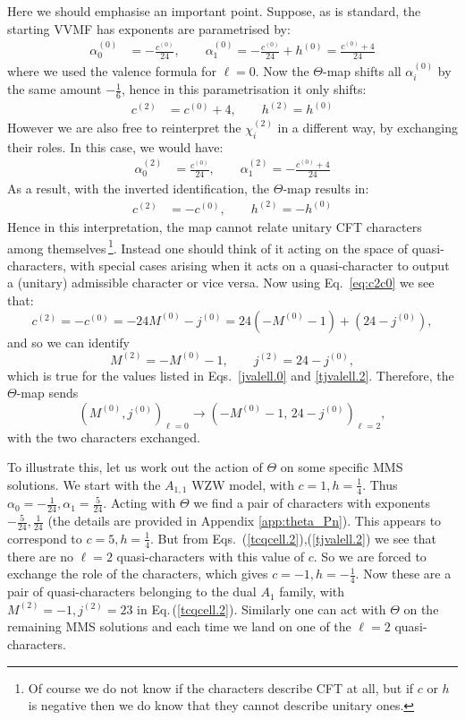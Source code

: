 \documentclass[11pt]{article}
\newcommand\be{\begin{equation}}
\newcommand\ee{\end{equation}}
\newcommand{\eref}[1]{Eq.\,(\ref{#1})}
\begin{document}
Here we should emphasise an important point. Suppose, as is standard, the starting VVMF has exponents are parametrised by:
\be
\begin{split}
\alpha_0^{(0)} &=-\frac{c^{(0)}}{24}, \qquad
\alpha_1^{(0)} =-\frac{c^{(0)}}{24}+h^{(0)}=\frac{c^{(0)}+4}{24}
\end{split}
\label{alphaell.0}
\ee
where we used the valence formula for $\ell=0$. 
Now the $\Theta$-map shifts all $\alpha_i^{(0)}$ by the same amount $-\frac16$, hence in this parametrisation it only shifts: \be
\begin{split}
c^{(2)} &= c^{(0)}+4, \qquad h^{(2)} = h^{(0)}
\end{split}
\ee
However we are also free to reinterpret the $\chi_i^{(2)}$ in a different way, by exchanging their roles. In this case, we would have:
\be
\begin{split}
\alpha_0^{(2)} &=\frac{c^{(0)}}{24},\qquad 
\alpha_1^{(2)} =-\frac{c^{(0)}+4}{24}
\end{split}
\ee
As a result, with the inverted identification, the $\Theta$-map results in:
\be\label{eq:c2c0}
\begin{split}
c^{(2)} &= -c^{(0)},\qquad h^{(2)} = -h^{(0)}
\end{split}
\ee
Hence in this interpretation, the map cannot relate unitary CFT characters among themselves\,\footnote{Of course we do not know if the characters describe CFT at all, but if $c$ or $h$ is negative then we do know that they cannot describe unitary ones.}. Instead one should think of it acting on the space of quasi-characters, with special cases arising when it acts on a quasi-character to output a (unitary) admissible character or vice versa. Now using Eq.~\eqref{eq:c2c0} we see that:
\be
  c^{(2)}
  =
  -c^{(0)}
  =
  -24M^{(0)}-j^{(0)}
  =
  24(-M^{(0)}-1)+(24-j^{(0)}),
\ee
and so we can identify
\be\label{eq:M2_M0}
  M^{(2)}=-M^{(0)}-1,
  \qquad
  j^{(2)}=24-j^{(0)},
\ee
which is true for the values listed in Eqs.~\eqref{jvalell.0} and \eqref{tjvalell.2}. Therefore, the \(\Theta\)-map sends
\be
  (M^{(0)},j^{(0)})_{\ell=0}
  \to
  (-M^{(0)}-1,\,24-j^{(0)})_{\ell=2},
\ee
with the two characters exchanged.

To illustrate this, let us work out the action of $\Theta$ on some specific MMS solutions.  We start with the $A_{1,1}$ WZW model, with $c=1, h=\frac14$. Thus $\alpha_0=-\frac{1}{24},\alpha_1=\frac{5}{24}$. Acting with $\Theta$ we find a pair of characters with exponents $-\frac{5}{24}, \frac{1}{24}$ (the details are provided in Appendix \ref{app:theta_Pn}). This appears to correspond to $c=5, h=\frac14$. But from Eqs.~(\ref{tcqcell.2}),(\ref{tjvalell.2}) we see that there are no $\ell=2$ quasi-characters with this value of $c$. So we are forced to exchange the role of the characters, which gives $c=-1,h=-\frac14$. Now these are a pair of quasi-characters belonging to the dual $A_1$ family, with $M^{(2)}=-1, j^{(2)}=23$ in \eref{tcqcell.2}. Similarly one can act with $\Theta$ on the remaining MMS solutions and each time we land on one of the $\ell=2$ quasi-characters.
\end{document}
